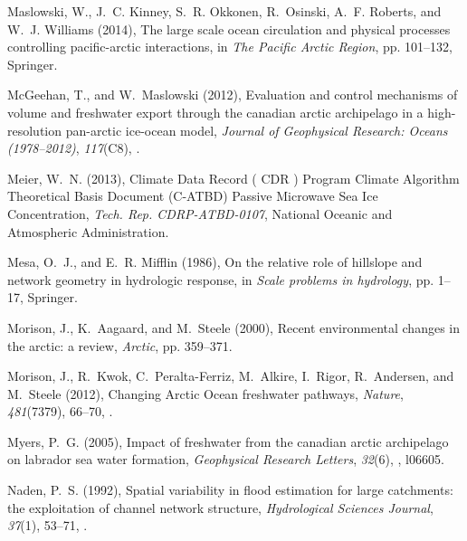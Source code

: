 \documentclass[jgrga, draft]{agutex}
\begin{document}
\begin{article}
\begin{thebibliography}{79}
Maslowski, W., J.~C. Kinney, S.~R. Okkonen, R.~Osinski, A.~F. Roberts, and
  W.~J. Williams (2014), The large scale ocean circulation and physical
  processes controlling pacific-arctic interactions, in \textit{The Pacific
  Arctic Region}, pp. 101--132, Springer.

McGeehan, T., and W.~Maslowski (2012), Evaluation and control mechanisms of
  volume and freshwater export through the canadian arctic archipelago in a
  high-resolution pan-arctic ice-ocean model, \textit{Journal of Geophysical
  Research: Oceans (1978--2012)}, \textit{117}(C8), .

Meier, W.~N. (2013), {Climate Data Record ( CDR ) Program Climate Algorithm
  Theoretical Basis Document (C-ATBD) Passive Microwave Sea Ice Concentration},
  \textit{Tech. Rep. CDRP-ATBD-0107}, National Oceanic and Atmospheric
  Administration.

Mesa, O.~J., and E.~R. Mifflin (1986), On the relative role of hillslope and
  network geometry in hydrologic response, in \textit{Scale problems in
  hydrology}, pp. 1--17, Springer.

Morison, J., K.~Aagaard, and M.~Steele (2000), Recent environmental changes in
  the arctic: a review, \textit{Arctic}, pp. 359--371.

Morison, J., R.~Kwok, C.~Peralta-Ferriz, M.~Alkire, I.~Rigor, R.~Andersen, and
  M.~Steele (2012), {Changing Arctic Ocean freshwater pathways},
  \textit{Nature}, \textit{481}(7379), 66--70, .

Myers, P.~G. (2005), Impact of freshwater from the canadian arctic archipelago
  on labrador sea water formation, \textit{Geophysical Research Letters},
  \textit{32}(6), , l06605.

Naden, P.~S. (1992), Spatial variability in flood estimation for large
  catchments: the exploitation of channel network structure,
  \textit{Hydrological Sciences Journal}, \textit{37}(1), 53--71,
  .


\end{thebibliography}
\end{article}
\end{document}
